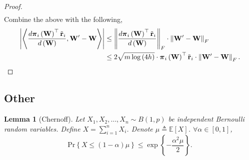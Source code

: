 \documentclass[10pt]{article}
\def\rvtilder{{\tilde{\mathbf{r}}}}
\def\pr{{\text{Pr}}}
\newtheorem{lem}{Lemma}
\def\rvpi{{\boldsymbol{\pi}}}
\def\rmW{{\mathbf{W}}}
\def\sE{{\mathbb{E}}}
\begin{document}
\begin{proof}
\begin{equation*}
\begin{split}
\end{split}
\end{equation*}
Combine the above with the following,
\begin{equation*}
\begin{split}
    \left| \left\langle \frac{d \rvpi_i\left( \rmW \right)^\top \rvtilder_i }{d\left( \rmW \right)}, \rmW^\prime - \rmW \right\rangle \right| &\le \left\| \frac{d \rvpi_i\left( \rmW \right)^\top \rvtilder_i }{d\left( \rmW \right)} \right\|_F \cdot \left\| \rmW^\prime - \rmW \right\|_F \\
    &\le 2 \sqrt{m \log{\left(4h\right)}} \cdot \rvpi_i\left( \rmW \right)^\top \rvtilder_i \cdot \left\| \rmW^\prime - \rmW \right\|_F. \qedhere
\end{split}
\end{equation*}
\end{proof}



\subsection{Other}

\begin{lem}[Chernoff]
    Let $X_1, X_2, \dots, X_n \sim B(1, p)$ be independent Bernoulli random variables. Define $X = \sum\limits_{i=1}^{n}{ X_i  }$. Denote $\mu \triangleq \sE\left[ X \right]$. $\forall \alpha \in [0,1]$,
\begin{equation*}
    \pr\left\{ X \le (1 - \alpha) \mu \right\} \le \exp\left\{ - \frac{\alpha^2 \mu}{2} \right\}.
\end{equation*}
\end{lem}

\begin{equation*}
\begin{split}
\end{split}
\end{equation*}
\end{document}
